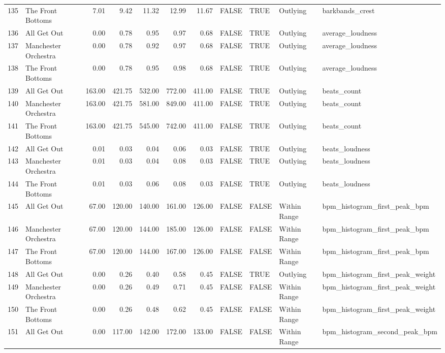 \begin{table}[ht]
\begin{tabular}{rlrrrrrllll}
  135 & The Front Bottoms & 7.01 & 9.42 & 11.32 & 12.99 & 11.67 & FALSE & TRUE & Outlying & barkbands\_crest \\ 
  136 & All Get Out & 0.00 & 0.78 & 0.95 & 0.97 & 0.68 & FALSE & TRUE & Outlying & average\_loudness \\ 
  137 & Manchester Orchestra & 0.00 & 0.78 & 0.92 & 0.97 & 0.68 & FALSE & TRUE & Outlying & average\_loudness \\ 
  138 & The Front Bottoms & 0.00 & 0.78 & 0.95 & 0.98 & 0.68 & FALSE & TRUE & Outlying & average\_loudness \\ 
  139 & All Get Out & 163.00 & 421.75 & 532.00 & 772.00 & 411.00 & FALSE & TRUE & Outlying & beats\_count \\ 
  140 & Manchester Orchestra & 163.00 & 421.75 & 581.00 & 849.00 & 411.00 & FALSE & TRUE & Outlying & beats\_count \\ 
  141 & The Front Bottoms & 163.00 & 421.75 & 545.00 & 742.00 & 411.00 & FALSE & TRUE & Outlying & beats\_count \\ 
  142 & All Get Out & 0.01 & 0.03 & 0.04 & 0.06 & 0.03 & FALSE & TRUE & Outlying & beats\_loudness \\ 
  143 & Manchester Orchestra & 0.01 & 0.03 & 0.04 & 0.08 & 0.03 & FALSE & TRUE & Outlying & beats\_loudness \\ 
  144 & The Front Bottoms & 0.01 & 0.03 & 0.06 & 0.08 & 0.03 & FALSE & TRUE & Outlying & beats\_loudness \\ 
  145 & All Get Out & 67.00 & 120.00 & 140.00 & 161.00 & 126.00 & FALSE & FALSE & Within Range & bpm\_histogram\_first\_peak\_bpm \\ 
  146 & Manchester Orchestra & 67.00 & 120.00 & 144.00 & 185.00 & 126.00 & FALSE & FALSE & Within Range & bpm\_histogram\_first\_peak\_bpm \\ 
  147 & The Front Bottoms & 67.00 & 120.00 & 144.00 & 167.00 & 126.00 & FALSE & FALSE & Within Range & bpm\_histogram\_first\_peak\_bpm \\ 
  148 & All Get Out & 0.00 & 0.26 & 0.40 & 0.58 & 0.45 & FALSE & TRUE & Outlying & bpm\_histogram\_first\_peak\_weight \\ 
  149 & Manchester Orchestra & 0.00 & 0.26 & 0.49 & 0.71 & 0.45 & FALSE & FALSE & Within Range & bpm\_histogram\_first\_peak\_weight \\ 
  150 & The Front Bottoms & 0.00 & 0.26 & 0.48 & 0.62 & 0.45 & FALSE & FALSE & Within Range & bpm\_histogram\_first\_peak\_weight \\ 
  151 & All Get Out & 0.00 & 117.00 & 142.00 & 172.00 & 133.00 & FALSE & FALSE & Within Range & bpm\_histogram\_second\_peak\_bpm \\ 

\end{tabular}
\end{table}
